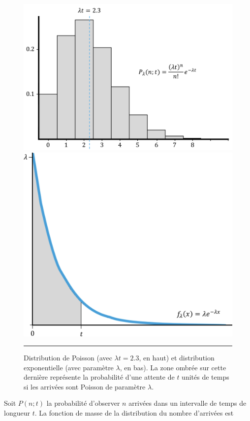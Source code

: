 \begin{figure}[!t]
\centering
\includegraphics[height=0.25\textheight]{Images/poisson.png}
\centering\includegraphics[height=0.25\textheight]{Images/exp.png}
\caption{\small Distribution de Poisson (avec $\lambda t=2.3$, en haut) et distribution exponentielle (avec  paramètre $\lambda$, en bas). La zone ombrée sur cette dernière représente la probabilité d’une attente de $t$ unités de temps si les arrivées sont Poisson de paramètre $\lambda$.}\label{fig:dist1}\hrule
\end{figure}
Soit $P(n;t)$ la probabilité d'observer $n$ arrivées dans un intervalle de temps de longueur $t$. La fonction de masse de la distribution du nombre d'arrivées est 
